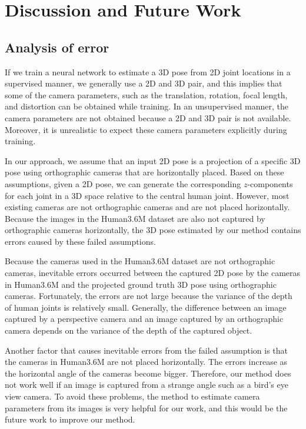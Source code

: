 \documentclass[runningheads]{llncs}
\begin{document}
\section{Discussion and Future Work}
\subsection{Analysis of error}
If we train a neural network to estimate a 3D pose from 2D joint locations in a supervised manner, we generally use a 2D and 3D pair, and this implies that some of the camera parameters, such as the translation, rotation, focal length, and distortion can be obtained while training.
In an unsupervised manner, the camera parameters are not obtained because a 2D and 3D pair is not available.
Moreover, it is unrealistic to expect these camera parameters explicitly during training.

In our approach, we assume that an input 2D pose is a projection of a specific 3D pose using orthographic cameras that are horizontally placed.
Based on these assumptions, given a 2D pose, we can generate the corresponding $z$-components for each joint in a 3D space relative to the central human joint.
However, most existing cameras are not orthographic cameras and are not placed horizontally.
Because the images in the Human3.6M dataset are also not captured by orthographic cameras horizontally, the 3D pose estimated by our method contains errors caused by these failed assumptions.

Because the cameras used in the Human3.6M dataset are not orthographic cameras, inevitable errors occurred between the captured 2D pose by the cameras in Human3.6M and the projected ground truth 3D pose using orthographic cameras.
Fortunately, the errors are not large because the variance of the depth of human joints is relatively small.
Generally, the difference between an image captured by a perspective camera and an image captured by an orthographic camera depends on the variance of the depth of the captured object.

Another factor that causes inevitable errors from the failed assumption is that the cameras in Human3.6M are not placed horizontally.
The errors increase as the horizontal angle of the cameras become bigger.
Therefore, our method does not work well if an image is captured from a strange angle such as a bird's eye view camera.
To avoid these problems, the method to estimate camera parameters from its images is very helpful for our work, and this would be the future work to improve our method.
\end{document}
